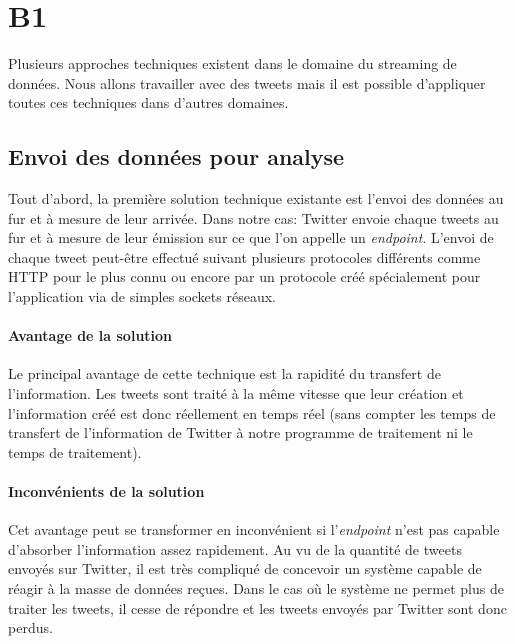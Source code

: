 \section{B1}
\label{sec:B1}

Plusieurs approches techniques existent dans le domaine du streaming de données. Nous allons travailler avec des tweets mais il est possible d'appliquer toutes ces techniques dans d'autres domaines.\\

\subsection{Envoi des données pour analyse}
\label{sub:Envoi des données pour analyse}

  Tout d'abord, la première solution technique existante est l'envoi des données au fur et à mesure de leur arrivée. Dans notre cas: Twitter envoie chaque tweets au fur et à mesure de leur émission sur ce que l'on appelle un \textit{endpoint}. L'envoi de chaque tweet peut-être effectué suivant plusieurs protocoles différents comme HTTP pour le plus connu ou encore par un protocole créé spécialement pour l'application via de simples sockets réseaux.\\

  \paragraph{Avantage de la solution}
  \label{par:Avantage de la solution}
  Le principal avantage de cette technique est la rapidité du transfert de l'information. Les tweets sont traité à la même vitesse que leur création et l'information créé est donc réellement en temps réel (sans compter les temps de transfert de l'information de Twitter à notre programme de traitement ni le temps de traitement).

  \paragraph{Inconvénients de la solution}
  \label{par:Inconvénients de la solution}
  Cet avantage peut se transformer en inconvénient si l'\textit{endpoint} n'est pas capable d'absorber l'information assez rapidement. Au vu de la quantité de tweets envoyés sur Twitter, il est très compliqué de concevoir un système capable de réagir à la masse de données reçues. Dans le cas où le système ne permet plus de traiter les tweets, il cesse de répondre et les tweets envoyés par Twitter sont donc perdus.\\

